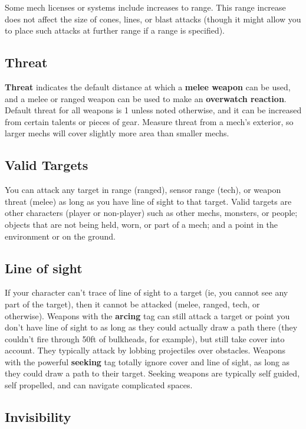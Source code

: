 Some mech licenses or systems include increases to range. This range increase does not affect the size of cones, lines, or blast attacks (though it might allow you to place such attacks at further range if a range is specified).


\subsection{Threat}
\textbf{Threat} indicates the default distance at which a \textbf{melee weapon} can be used, and a melee or
ranged weapon can be used to make an \textbf{overwatch reaction}. Default threat for all weapons is 1
unless noted otherwise, and it can be increased from certain talents or pieces of gear. Measure
threat from a mech’s exterior, so larger mechs will cover slightly more area than smaller mechs.

\subsection{Valid Targets}

You can attack any target in range (ranged), sensor range (tech), or weapon threat (melee) as long as you have line of sight to that target. Valid targets are other characters (player or non-player) such as other mechs, monsters, or people; objects that are not being held, worn, or part of a mech; and a point in the environment or on the ground.

\subsection{Line of sight}

If your character can’t trace of line of sight to a target (ie, you cannot see any part of the target), then it cannot be attacked (melee, ranged, tech, or otherwise). Weapons with the \textbf{arcing} tag can still attack a target or point you don’t have line of sight to as long as they could actually draw a path there (they couldn’t fire through 50ft of bulkheads, for example), but still take cover into account. They typically attack by lobbing projectiles over obstacles. Weapons with the powerful \textbf{seeking} tag totally ignore cover and line of sight, as long as they could draw a path to their target. Seeking weapons are typically self guided, self propelled, and can navigate complicated spaces.

\subsection{Invisibility}


